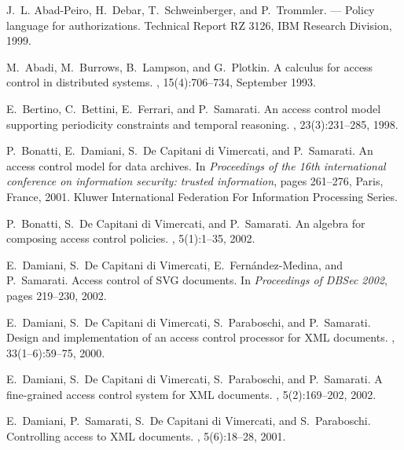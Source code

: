 \documentclass{acm_proc_article-sp}
\begin{document}

%
\begin{thebibliography}{10}

J.~L. Abad-Peiro, H.~Debar, T.~Schweinberger, and P.~Trommler.
 --- {P}olicy language for authorizations.
\newblock Technical Report RZ 3126, IBM Research Division, 1999.

M.~Abadi, M.~Burrows, B.~Lampson, and G.~Plotkin.
\newblock A calculus for access control in distributed systems.
,
  15(4):706--734, September 1993.

E.~Bertino, C.~Bettini, E.~Ferrari, and P.~Samarati.
\newblock An access control model supporting periodicity constraints and
  temporal reasoning.
, 23(3):231--285, 1998.

P.~Bonatti, E.~Damiani, S.~{De Capitani di Vimercati}, and P.~Samarati.
\newblock An access control model for data archives.
\newblock In {\em Proceedings of the 16th international conference on
  information security: trusted information}, pages 261--276, Paris, France,
  2001. Kluwer International Federation For Information Processing Series.

P.~Bonatti, S.~{De Capitani di Vimercati}, and P.~Samarati.
\newblock An algebra for composing access control policies.
, 5(1):1--35,
  2002.

E.~Damiani, S.~{De Capitani di Vimercati}, E.~Fern\'andez-Medina, and
  P.~Samarati.
\newblock Access control of {SVG} documents.
\newblock In {\em Proceedings of DBSec 2002}, pages 219--230, 2002.

E.~Damiani, S.~{De Capitani di Vimercati}, S.~Paraboschi, and P.~Samarati.
\newblock Design and implementation of an access control processor for {XML}
  documents.
, 33(1--6):59--75, 2000.

E.~Damiani, S.~{De Capitani di Vimercati}, S.~Paraboschi, and P.~Samarati.
\newblock A fine-grained access control system for {XML} documents.
,
  5(2):169--202, 2002.

E.~Damiani, P.~Samarati, S.~{De Capitani di Vimercati}, and S.~Paraboschi.
\newblock Controlling access to {XML} documents.
, 5(6):18--28, 2001.


\end{thebibliography}
\end{document}
